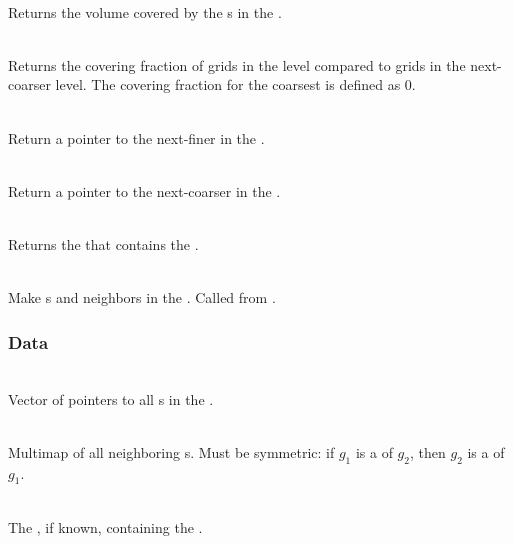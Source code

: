 \documentclass[11pt]{article}
\begin{document}
     \\
    Returns the volume covered by the s in the .

     \\ Returns the
    covering fraction of grids in the level compared to grids in the
    next-coarser level.  The covering fraction for the coarsest
     is defined as 0.

     \\
    Return a pointer to the next-finer  in the .

     \\
    Return a pointer to the next-coarser  in the .

     \\
    Returns the  that contains the .

     \\
    Make s  and  neighbors in the .
    Called from .

\subsubsection{ Data}


     \\
    Vector of pointers to all s in the .

     \\
    Multimap of all neighboring s.  Must be symmetric: if
     $g_1$ is a  of $g_2$, then $g_2$ is a
     of $g_1$.

     \\ The
    , if known, containing the .
\end{document}

